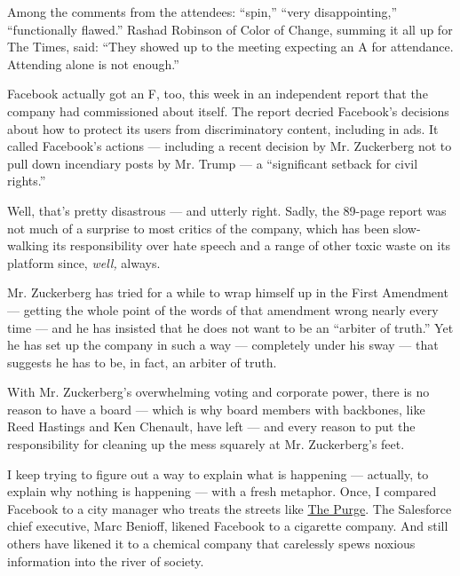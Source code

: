 Among the comments from the attendees: ``spin,'' ``very disappointing,''
``functionally flawed.'' Rashad Robinson of Color of Change, summing it
all up for The Times, said: ``They showed up to the meeting expecting an
A for attendance. Attending alone is not enough.''

Facebook actually got an F, too, this week in an independent report that
the company had commissioned about itself. The report decried Facebook's
decisions about how to protect its users from discriminatory content,
including in ads. It called Facebook's actions --- including a recent
decision by Mr. Zuckerberg not to pull down incendiary posts by Mr.
Trump --- a ``significant setback for civil rights.''

Well, that's pretty disastrous --- and utterly right. Sadly, the 89-page
report was not much of a surprise to most critics of the company, which
has been slow-walking its responsibility over hate speech and a range of
other toxic waste on its platform since, \emph{well,} always.

Mr. Zuckerberg has tried for a while to wrap himself up in the First
Amendment --- getting the whole point of the words of that amendment
wrong nearly every time --- and he has insisted that he does not want to
be an ``arbiter of truth.'' Yet he has set up the company in such a way
--- completely under his sway --- that suggests he has to be, in fact,
an arbiter of truth.

With Mr. Zuckerberg's overwhelming voting and corporate power, there is
no reason to have a board --- which is why board members with backbones,
like Reed Hastings and Ken Chenault, have left --- and every reason to
put the responsibility for cleaning up the mess squarely at Mr.
Zuckerberg's feet.

I keep trying to figure out a way to explain what is happening ---
actually, to explain why nothing is happening --- with a fresh metaphor.
Once, I compared Facebook to a city manager who treats the streets like
\href{https://www.hulu.com/series/the-purge-c5c9e867-73c7-4c1b-a8e0-cc0e0e4b95ed?\&cmp=7958\&utm_source=google\&utm_medium=cpc\&utm_campaign=BM\%20Search\%20TV\%20Shows\&utm_term=the\%20purge\%20tv\%20show\&ds_rl=1263136\&gclid=Cj0KCQjwo6D4BRDgARIsAA6uN1-t7rwlRySiUXwOBwRGdSTAg4H2592FcPMyeq6vI4524MJaFUIyvHoaAmcTEALw_wcB\&gclsrc=aw.ds}{The
Purge}. The Salesforce chief executive, Marc Benioff, likened Facebook
to a cigarette company. And still others have likened it to a chemical
company that carelessly spews noxious information into the river of
society.


